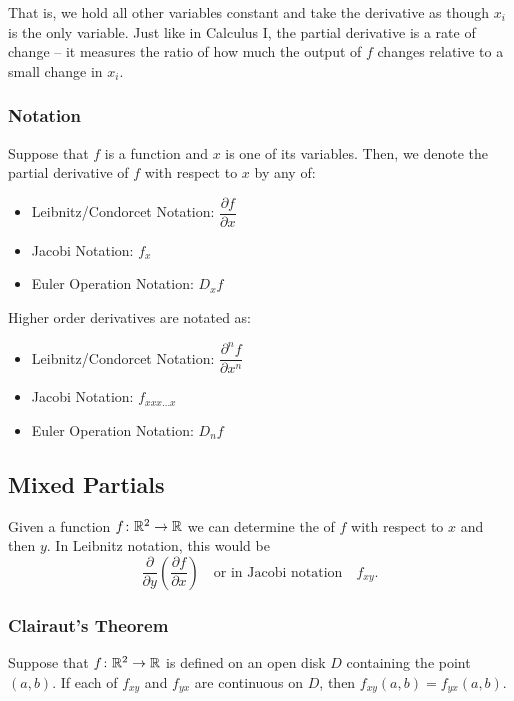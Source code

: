 That is, we hold all other variables constant and take the derivative as though \(x_{i}\) is the only variable. Just like in Calculus I, the partial derivative is a rate of change – it measures the ratio of how much the output of \(f\) changes relative to a small change in \(x_{i}\).

\subsubsection{Notation}

Suppose that \(f\) is a function and \(x\) is one of its variables. Then, we denote the partial derivative of \(f\) with respect to \(x\) by any of:
\begin{itemize}
    \item Leibnitz/Condorcet Notation: \(\dfrac{\partial f}{\partial x}\)
    \item Jacobi Notation: \(f_{x}\)
    \item Euler Operation Notation: \(D_{x}f\)
\end{itemize}
Higher order derivatives are notated as:
\begin{itemize}
    \item Leibnitz/Condorcet Notation: \(\dfrac{\partial^{n} f}{\partial x^{n}}\)
    \item Jacobi Notation: \(f_{xxx\ldots x}\)
    \item Euler Operation Notation: \(D_{n}f\)
\end{itemize}

\subsection{Mixed Partials}

Given a function \(f \colon \mathbb{R}^{2} \to \mathbb{R}\) we can determine the  of \(f\) with respect to \(x\) and then \(y\). In Leibnitz notation, this would be
\[
\dfrac{\partial}{\partial y} \left( \dfrac{\partial f}{\partial x} \right) \quad \text{or in Jacobi notation} \quad f_{xy}.
\]

\subsubsection{Clairaut’s Theorem}

Suppose that \(f \colon \mathbb{R}^{2} \to \mathbb{R}\) is defined on an open disk \(D\) containing the point \((a, b)\). If each of \(f_{xy}\) and \(f_{yx}\) are continuous on \(D\), then \(f_{xy}(a, b) = f_{yx}(a, b)\). \\

